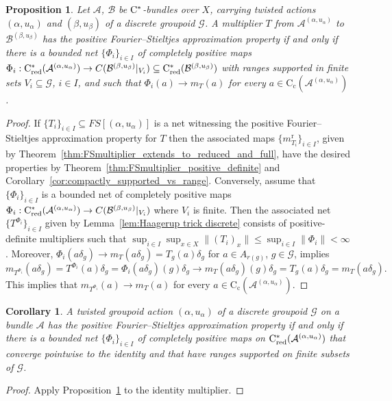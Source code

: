\documentclass[11 pt, leqno]{amsart}
\numberwithin{equation}{section}
\theoremstyle{plain}
\newtheorem {prop}[thm] {Proposition}
\newtheorem{cor}[thm]{Corollary}
\theoremstyle{definition}
\newcommand*{\contc}{\mathrm{C_c}}%
\DeclareMathOperator{\red}{red}%
\DeclareMathOperator{\rd}{r}%
\newcommand{\B}{\mathcal B}
\newcommand{\m}{m}
\newcommand{\G}{\mathcal G} %
\newcommand{\A}{\mathcal A}
\newcommand{\cst}{\ifmmode\mathrm{C}^*\else{$\mathrm{C}^*$}\fi}
\begin{document}
\begin{prop}\label{prop:positive_FS_AP_for_actions2} 
Let $\A$, $\B$  be $\cst$-bundles over $X$, carrying twisted actions $(\alpha,u_\alpha)$ and $(\beta,u_\beta)$ of a discrete groupoid $\G$.
A multiplier $T$ from $\A^{(\alpha,u_{\alpha})}$ to $\B^{(\beta,u_{\beta})}$ has the positive Fourier--Stieltjes approximation property if and only if there is a bounded net $\{\Phi_{i}\}_{i\in I}$ of completely positive maps $\Phi_i:\cst_{\red}(\A^{(\alpha,u_\alpha)})\to C(\B^{(\beta,u_\beta)}|_{V_i})\subseteq \cst_{\red}(\B^{(\beta,u_\beta)})$ with ranges supported in finite sets $V_i\subseteq \G$, $i\in I$, and such that $\Phi_i(a)\to m_T(a)$ for every $a \in \contc(\A^{(\alpha,u_\alpha)})$. 
\end{prop}
\begin{proof}  
If $\{ T_{i} \}_{i\in I} \subseteq FS[(\alpha,u_{\alpha})]$ is a net witnessing the positive Fourier--Stieltjes approximation property for $T$ then the associated maps $\{\m_{T_i}^{\rd}\}_{i\in I}$, given by Theorem~\ref{thm:FSmultiplier_extends_to_reduced_and_full}, have the desired properties by Theorem~\ref{thm:FSmultiplier_positive_definite} and Corollary~\ref{cor:compactly_supported_vs_range}. 
Conversely, assume that $\{\Phi_{i}\}_{i\in I}$ is a bounded net of completely positive maps $\Phi_i : \cst_{\red}(\A^{(\alpha,u_\alpha)}) \to C(\B^{(\beta,u_\beta)}|_{V_i})$ where $V_i$ is finite. 
Then the associated net $\{T^{\Phi_{i}}\}_{i\in I}$ given by Lemma~\ref{lem:Haagerup trick discrete} consists of positive-definite multipliers such that $\sup_{i\in I}\sup_{x\in X}\|(T_i)_{x}\| \leq \sup_{i\in I} \|\Phi_i\|<\infty$. 
Moreover, $\Phi_i(a\delta_g)\to m_T(a\delta_g) = T_{g}(a)\delta_g$ for $a\in A_{r(g)}$, $g\in \G$, implies 
\[
    \m_{T^{\Phi_i}} (a\delta_g) = T^{\Phi_i}(a) \delta_g = \Phi_i(a\delta_g)(g)\delta_g \to \m_T(a\delta_g)(g) \delta_g = T_{g}(a) \delta_g = m_T(a\delta_g) . 
\]
This implies that $\m_{T^{\Phi_i}}(a)\to m_T(a)$ for every $a\in \contc(\A^{(\alpha,u_\alpha)})$.
\end{proof}
 
\begin{cor}\label{cor:characterisation_FS_AP_for_discrete}
A twisted groupoid action $(\alpha,u_{\alpha})$ of a discrete groupoid $\G$ on a bundle $\A$ has the positive Fourier--Stieltjes approximation property if and only if there is a bounded net $\{\Phi_{i}\}_{i\in I}$ of completely positive maps on $\cst_{\red}(\A^{(\alpha,u_{\alpha})})$ that converge pointwise to the identity and that have ranges supported on finite subsets of $\G$. 
\end{cor}
\begin{proof} 
Apply Proposition~\ref{prop:positive_FS_AP_for_actions2} to the identity multiplier.
\end{proof}
\end{document}
